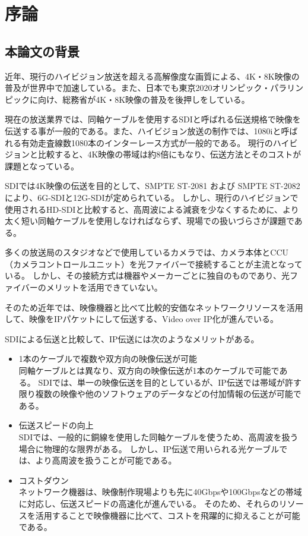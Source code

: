 \chapter{序論}
\label{chap:introduction}

\section{本論文の背景}
近年、現行のハイビジョン放送を超える高解像度な画質による、4K・8K映像の普及が世界中で加速している。また、日本でも東京2020オリンピック・パラリンピックに向け、総務省が4K・8K映像の普及を後押しをしている。

現在の放送業界では、同軸ケーブルを使用するSDIと呼ばれる伝送規格で映像を伝送する事が一般的である。また、ハイビジョン放送の制作では、1080iと呼ばれる有効走査線数1080本のインターレース方式が一般的である。
現行のハイビジョンと比較すると、4K映像の帯域は約8倍にもなり、伝送方法とそのコストが課題となっている。

SDIでは4K映像の伝送を目的として、SMPTE ST-2081 および SMPTE ST-2082により、6G-SDIと12G-SDIが定められている。
しかし、現行のハイビジョンで使用されるHD-SDIと比較すると、高周波による減衰を少なくするために、より太く短い同軸ケーブルを使用しなければならず、現場での扱いづらさが課題である。

多くの放送局のスタジオなどで使用しているカメラでは、カメラ本体とCCU（カメラコントロールユニット）を光ファイバーで接続することが主流となっている。
しかし、その接続方式は機器やメーカーごとに独自のものであり、光ファイバーのメリットを活用できていない。

そのため近年では、映像機器と比べて比較的安価なネットワークリソースを活用して、映像をIPパケットにして伝送する、Video over IP化が進んでいる。

SDIによる伝送と比較して、IP伝送には次のようなメリットがある\cite{kodera-interbee2015}。
\begin{itemize}
  \item 1本のケーブルで複数や双方向の映像伝送が可能\mbox{}\\
    同軸ケーブルとは異なり、双方向の映像伝送が1本のケーブルで可能である。
    SDIでは、単一の映像伝送を目的としているが、IP伝送では帯域が許す限り複数の映像や他のソフトウェアのデータなどの付加情報の伝送が可能である。
  \item 伝送スピードの向上\mbox{}\\
    SDIでは、一般的に銅線を使用した同軸ケーブルを使うため、高周波を扱う場合に物理的な限界がある。
    しかし、IP伝送で用いられる光ケーブルでは、より高周波を扱うことが可能である。
  \item コストダウン\mbox{}\\
    ネットワーク機器は、映像制作現場よりも先に40Gbpsや100Gbpsなどの帯域に対応し、伝送スピードの高速化が進んでいる。
    そのため、それらのリソースを活用することで映像機器に比べて、コストを飛躍的に抑えることが可能である。
\end{itemize}

